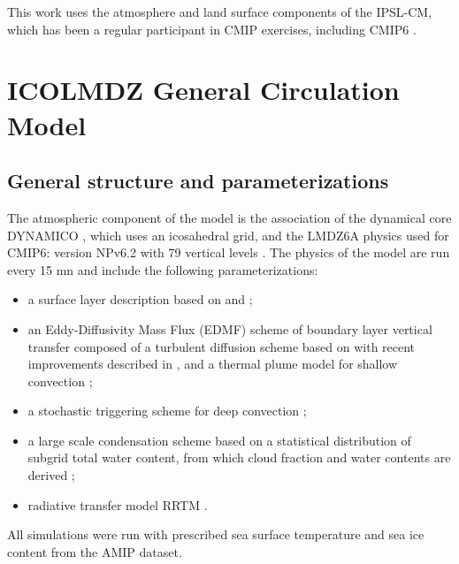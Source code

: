 This work uses the atmosphere and land surface components of the IPSL-CM, which has been a regular participant in CMIP exercises, including CMIP6 \citep{boucher_presentation_2020}. 

\section{ICOLMDZ General Circulation Model}
\subsection{General structure and parameterizations}
The atmospheric component of the model is the association of the dynamical core DYNAMICO \citep{dubos_dynamico-10_2015}, which uses an icosahedral grid, and the LMDZ6A physics used for CMIP6: version NPv6.2 with 79 vertical levels \citep{hourdin_lmdz6a_2020}. The physics of the model are run every 15 mn and include the following parameterizations:
\begin{itemize}
    \item a surface layer description based on \cite{louis_parametric_1979} and \cite{king_sensitivity_2001}; 
    \item an Eddy-Diffusivity Mass Flux (EDMF) scheme of boundary layer vertical transfer composed of a turbulent diffusion scheme based on \cite{yamada_simulations_1983} with recent improvements described in \cite{vignon_modeling_2018}, and a thermal plume model for shallow convection \citep{hourdin_unified_2019}; 
    \item a stochastic triggering scheme for deep convection \citep{rochetin_deep_2014, rochetin_deep_2014-1}; 
    \item a large scale condensation scheme based on a statistical distribution of subgrid total water content, from which cloud fraction and water contents are derived \citep{madeleine_improved_2020}; 
    \item radiative transfer model RRTM \citep{mlawer_radiative_1997}.
\end{itemize}

All simulations were run with prescribed sea surface temperature and sea ice content from the AMIP dataset.


